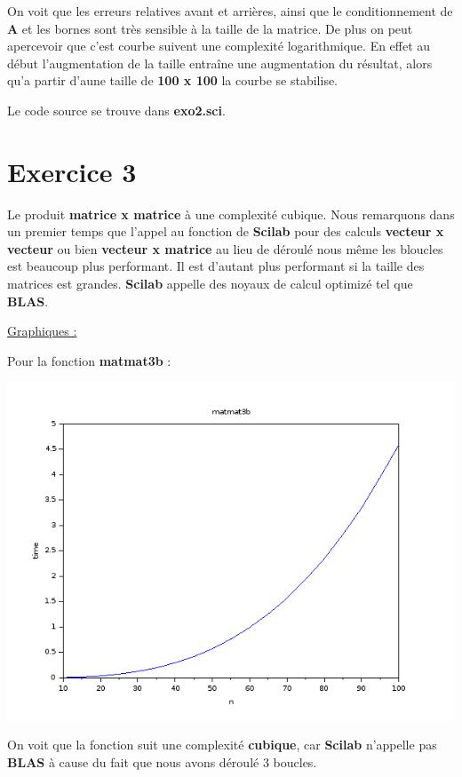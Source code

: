 \documentclass{article}
\begin{document}
On voit que les erreurs relatives avant et arrières, ainsi que le
conditionnement de \textbf{A} et les bornes sont très sensible à la
taille de la matrice. De plus on peut apercevoir que c'est courbe
suivent une complexité logarithmique. En effet au début
l'augmentation de la taille entraîne une augmentation du résultat,
alors qu'a partir d'aune taille de \textbf{100 x 100} la courbe se
stabilise. \newline

Le code source se trouve dans \textbf{exo2.sci}.

\section*{Exercice 3}

Le produit \textbf{matrice x matrice} à une complexité cubique.
Nous remarquons dans un premier temps que l'appel au fonction de
\textbf{Scilab} pour des calculs \textbf{vecteur x vecteur} ou bien
\textbf{vecteur x matrice} au lieu de déroulé nous même les bloucles
est beaucoup plus performant. Il est d'autant plus performant si la
taille des matrices est grandes. \textbf{Scilab} appelle des noyaux de
calcul optimizé tel que \textbf{BLAS}. \newline

\underline{Graphiques :} \newline

Pour la fonction \textbf{matmat3b} :

\includegraphics[scale=0.5]{img/matmat3b.png}

On voit que la fonction suit une complexité \textbf{cubique}, car
\textbf{Scilab} n'appelle pas \textbf{BLAS} à cause du fait que nous
avons déroulé 3 boucles. \newline
\end{document}
